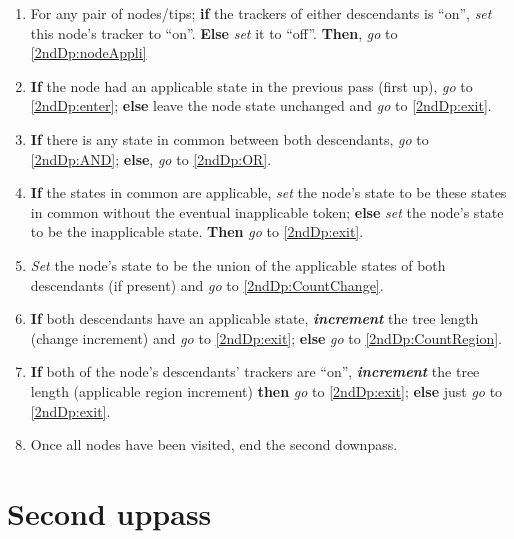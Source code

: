\documentclass[a4paper,12pt]{article}
\begin{document}
\begin{enumerate}

    \item \label{2ndDp:entry} For any pair of nodes/tips; \textbf{if} the trackers of either descendants is ``on'', \textit{set} this node's tracker to ``on''. \textbf{Else} \textit{set} it to ``off''. \textbf{Then}, \textit{go} to \ref{2ndDp:nodeAppli}
    \item \label{2ndDp:nodeAppli} \textbf{If} the node had an applicable state in the previous pass (first up), \textit{go} to \ref{2ndDp:enter}; \textbf{else} leave the node state unchanged and \textit{go} to \ref{2ndDp:exit}.
    \item \label{2ndDp:enter} \textbf{If} there is any state in common between both descendants, \textit{go} to \ref{2ndDp:AND}; \textbf{else}, \textit{go} to \ref{2ndDp:OR}.
    \item \label{2ndDp:AND} \textbf{If} the states in common are applicable, \textit{set} the node's state to be these states in common without the eventual inapplicable token; \textbf{else} \textit{set} the node's state to be the inapplicable state. \textbf{Then} \textit{go} to \ref{2ndDp:exit}. 
    \item \label{2ndDp:OR} \textit{Set} the node's state to be the union of the applicable states of both descendants (if present) and \textit{go} to \ref{2ndDp:CountChange}.
    \item \label{2ndDp:CountChange} \textbf{If} both descendants have an applicable state, \textbf{\textit{increment}} the tree length (change increment) and \textit{go} to \ref{2ndDp:exit}; \textbf{else} \textit{go} to \ref{2ndDp:CountRegion}.
    \item \label{2ndDp:CountRegion} \textbf{If} both of the node's descendants' trackers are ``on'', \textbf{\textit{increment}} the tree length (applicable region increment) \textbf{then} \textit{go} to \ref{2ndDp:exit}; \textbf{else} just \textit{go} to \ref{2ndDp:exit}.
    \item \label{2ndDp:exit} Once all nodes have been visited, end the second downpass. 
\end{enumerate}

\section{Second uppass} \label{2ndUp}
\end{document}
